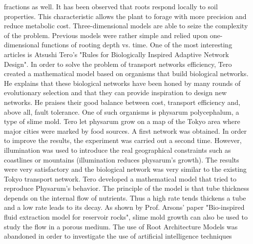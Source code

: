 fractions as well. It has been observed that roots respond locally to soil properties. This
characteristic allows the plant to forage with more precision and reduce metabolic cost.
Three-dimensional models are able to seize the complexity of the problem. Previous
models were rather simple and relied upon one-dimensional functions of rooting depth vs.
time.
\bigbreak
One of the most interesting articles is Atsushi Tero’s "Rules for Biologically Inspired
Adaptive Network Design". In order to solve the problem of transport networks efficiency,
Tero created a mathematical model based on organisms that build biological networks. He
explains that these biological networks have been honed by many rounds of evolutionary
selection and that they can provide inspiration to design new networks. He praises their
good balance between cost, transport efficiency and, above all, fault tolerance. One of
such organisms is physarum polycephalum, a type of slime mold. Tero let physarum
grow on a map of the Tokyo area where major cities were marked by food sources. A
first network was obtained. In order to improve the results, the experiment was carried
out a second time. However, illumination was used to introduce the real geographical
constraints such as coastlines or mountains (illumination reduces physarum’s growth). The
results were very satisfactory and the biological network was very similar to the existing
Tokyo transport network. Tero developed a mathematical model that tried to reproduce
Physarum’s behavior. The principle of the model is that tube thickness depends on the
internal flow of nutrients. Thus a high rate tends thickens a tube and a low rate leads
to its decay. As shown by Prof. Arsons’ paper "Bio-inspired fluid extraction model for
reservoir rocks", slime mold growth can also be used to study the flow in a porous medium.
The use of Root Architecture Models was abandoned in order to investigate the use of artificial intelligence techniques

